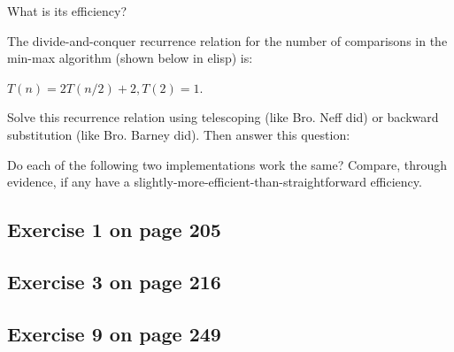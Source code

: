 \documentclass[12pt]{amsart}
\begin{document}
  What is its efficiency?

  The divide-and-conquer recurrence relation for the number of
  comparisons in the min-max algorithm (shown below in elisp) is:

  $T(n) = 2T(n/2) + 2, T(2) = 1$.

  Solve this recurrence relation using telescoping (like Bro. Neff did) or backward substitution (like Bro. Barney did). Then answer this question:

  Do each of the following two implementations work the same? Compare, through evidence, if any have a slightly-more-efficient-than-straightforward efficiency.


\lstset{language=C++}


\lstset{language=Swift}
  
\subsection{Exercise 1 on page 205} 
\subsection{Exercise 3 on page 216}
\subsection{Exercise 9 on page 249}
\end{document}
